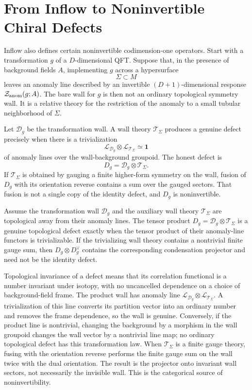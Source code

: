 \section{From Inflow to Noninvertible Chiral Defects}
\label{sec:inflow-to-noninvertible-chiral-defects}

Inflow also defines certain noninvertible codimension-one operators.  Start
with a transformation \(g\) of a \(D\)-dimensional QFT.  Suppose that, in the
presence of background fields \(A\), implementing \(g\) across a hypersurface
\[
  \Sigma\subset M
\]
leaves an anomaly line described by an invertible \((D+1)\)-dimensional
response \(\mathcal Z_{\rm anom}(g;A)\).  The bare wall for \(g\) is then not
an ordinary topological symmetry wall.  It is a relative theory for the
restriction of the anomaly to a small tubular neighborhood of \(\Sigma\).

Let \(\mathcal D_g\) be the transformation wall.  A wall theory
\(\mathcal T_\Sigma\) produces a genuine defect precisely when there is a
trivialization
\[
  \mathcal L_{\mathcal D_g}\otimes
  \mathcal L_{\mathcal T_\Sigma}
  \simeq
  \mathbf 1
\]
of anomaly lines over the wall-background groupoid.  The honest defect is
\[
  D_g=\mathcal D_g\otimes\mathcal T_\Sigma .
\]
If \(\mathcal T_\Sigma\) is obtained by gauging a finite higher-form symmetry
on the wall, fusion of \(D_g\) with its orientation reverse contains a sum
over the gauged sectors.  That fusion is not a single copy of the identity
defect, and \(D_g\) is noninvertible.

\begin{remark}
\label{rem:wall-trivialization-criterion}
Assume the transformation wall \(\mathcal D_g\) and the auxiliary wall theory
\(\mathcal T_\Sigma\) are topological away from their anomaly lines.  The
tensor product \(D_g=\mathcal D_g\otimes\mathcal T_\Sigma\) is a genuine
topological defect exactly when the tensor product of their anomaly-line
functors is trivializable.  If the trivializing wall theory contains a
nontrivial finite gauge sum, then \(D_g\otimes D_g^\vee\) contains the
corresponding condensation projector and need not be the identity defect.

Topological invariance of a defect means that its correlation functional is a
number invariant under isotopy, with no uncancelled dependence on a choice of
background-field frame.  The product wall has anomaly line
\(\mathcal L_{\mathcal D_g}\otimes\mathcal L_{\mathcal T_\Sigma}\).  A
trivialization of this line converts its partition vector into an ordinary
number and removes the frame dependence, so the wall is genuine.  Conversely,
if the product line is nontrivial, changing the background by a morphism in
the wall groupoid changes the wall vector by a nontrivial line map; no
ordinary topological defect has this transformation law.  When
\(\mathcal T_\Sigma\) is a finite gauge theory, fusing with the orientation
reverse performs the finite gauge sum on the wall twice with the dual
orientation.  The result is the projector onto invariant wall sectors, not
necessarily the invisible wall.  This is the categorical source of
noninvertibility.
\end{remark}

